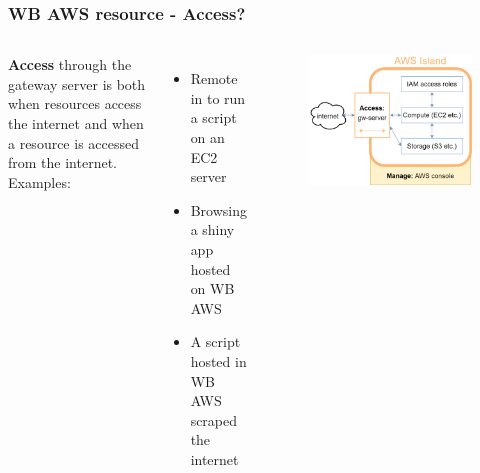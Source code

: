 \documentclass[aspectratio=169]{beamer} %
\begin{document}
\begin{frame}
	\frametitle{WB AWS resource - Access?}
	\begin{columns}[c]
		\textbf{Access} through the gateway server is both
		when resources access the internet and
		when a resource is accessed from the internet.
		\vspace{.5cm}\newline
		Examples:
		\begin{itemize}
			\item Remote in to run a script on an EC2 server
			\item Browsing a shiny app hosted on WB AWS
			\item A script hosted in WB AWS scraped the internet
		\end{itemize}

		\begin{figure}
			\centering
			\includegraphics[width=\textwidth]{./img/wb-aws.png}
		\end{figure}

	\end{columns}
\end{frame}
\end{document}
